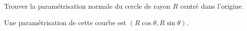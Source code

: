 \begin{exercice}\label{exoGeomAnal-0038}

Trouver la paramétrisation normale du cercle de rayon $R$ centré dans l'origine. 

Une paramétrisation de cette courbe est $(R\cos\theta, R\sin\theta)$.  

  

\end{exercice}
